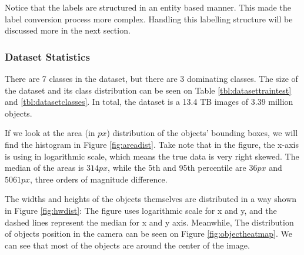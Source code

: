   

  Notice that the labels are structured in an entity based manner. This made the label conversion process
  more complex. Handling this labelling structure will be discussed more in the next section.

  \subsubsection{Dataset Statistics}
  There are 7 classes in the dataset, but there are 3 dominating classes.
  The size of the dataset and its class distribution can be seen on Table \ref{tbl:datasettraintest} and
  \ref{tbl:datasetclasses}. In total, the dataset is a 13.4 TB images of 3.39 million objects.
  \begin{table}
    \centering
    \label{tbl:datasettraintest}
    
  \end{table}
  \begin{table}
    \centering
    \label{tbl:datasetclasses}
    
  \end{table}

  If we look at the area (in $px$) distribution of the objects' bounding boxes, we will find
  the histogram in Figure \ref{fig:areadist}. Take note that in the figure, the x-axis is 
  using in logarithmic scale, which means the true data is very right skewed.
  The median of the areas is $314 px$, while the 5th and 95th percentile are $36 px$ and $5061 px$, three orders of magnitude difference.


  The widths and heights of the objects themselves are distributed in a way shown in Figure \ref{fig:hwdist}:
  The figure uses logarithmic scale for x and y, and the dashed lines represent the median for x and y axis.
  Meanwhile, The distribution of objects position in the camera can be seen on Figure \ref{fig:objectheatmap}.
  We can see that most of the objects are around the center of the image.

